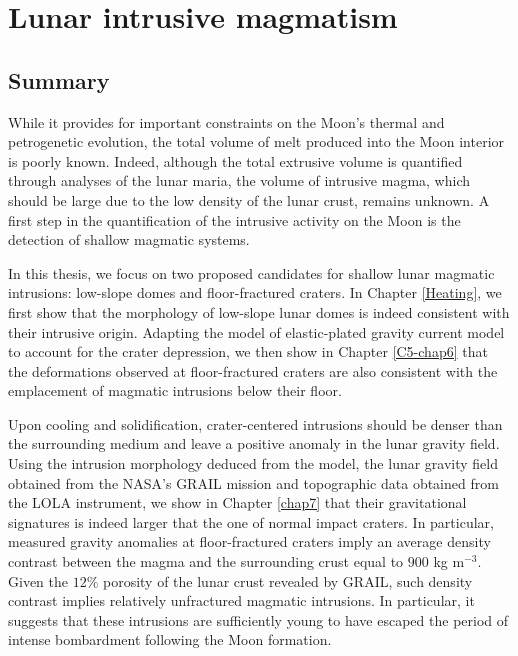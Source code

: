 \section{Lunar intrusive magmatism}
\label{sec:terr-intr-magm}

\subsection{Summary}
\label{sec:summary}

While it provides for important  constraints on the Moon's thermal and
petrogenetic evolution,  the total  volume of  melt produced  into the
Moon interior is  poorly known.  Indeed, although  the total extrusive
volume is quantified  through analyses of the lunar  maria, the volume
of intrusive  magma, which should be  large due to the  low density of
the lunar crust,  remains unknown. A first step  in the quantification
of the  intrusive activity  on the  Moon is  the detection  of shallow
magmatic systems.

In this thesis, we focus on  two proposed candidates for shallow lunar
magmatic intrusions:  low-slope domes and floor-fractured  craters. In
Chapter \ref{Heating}, we first show  that the morphology of low-slope
lunar  domes  is  indeed   consistent  with  their  intrusive  origin.
Adapting the model of elastic-plated  gravity current model to account
for the crater depression, we then show in Chapter \ref{C5-chap6} that
the  deformations   observed  at  floor-fractured  craters   are  also
consistent  with the  emplacement of  magmatic intrusions  below their
floor.

Upon cooling and solidification,  crater-centered intrusions should be
denser than the surrounding medium and leave a positive anomaly in the
lunar gravity field.  Using the  intrusion morphology deduced from the
model, the lunar gravity field  obtained from the NASA’s GRAIL mission
and topographic  data obtained  from the LOLA  instrument, we  show in
Chapter  \ref{chap7} that  their  gravitational  signatures is  indeed
larger that the one of  normal impact craters. In particular, measured
gravity anomalies at floor-fractured  craters imply an average density
contrast between the magma and the surrounding crust equal to $900$ kg
m$^{-3}$. Given  the $12\%$  porosity of the  lunar crust  revealed by
GRAIL, such  density contrast implies relatively  unfractured magmatic
intrusions.   In particular,  it  suggests that  these intrusions  are
sufficiently young to  have escaped the period  of intense bombardment
following the Moon formation.


